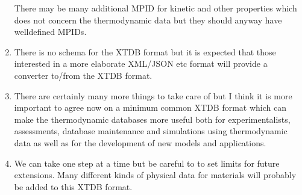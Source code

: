 \documentclass{article}
\begin{document}
\begin{enumerate}
  There may be many additional MPID for kinetic and other properties
  which does not concern the thermodynamic data but they should anyway
  have welldefined MPIDs.

\item There is no schema for the XTDB format but it is expected that those
  interested in a more elaborate XML/JSON etc format will provide a
  converter to/from the XTDB format.
  
\item There are certainly many more things to take care of but I think
  it is more important to agree now on a minimum common XTDB format
  which can make the thermodynamic databases more useful both for
  experimentalists, assessments, database maintenance and simulations
  using thermodynamic data as well as for the development of new
  models and applications.

\item We can take one step at a time but be careful to to set limits for
future extensions.  Many different kinds of physical data for
materials will probably be added to this XTDB format.

\end{enumerate}
\end{document}
